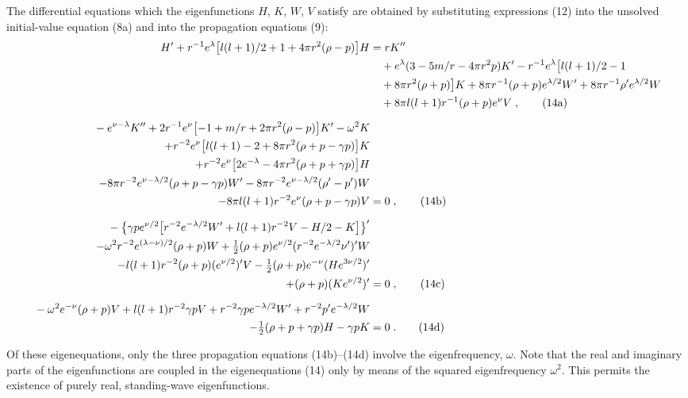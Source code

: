 \documentclass[12pt]{article}
\begin{document}
The differential equations which the eigenfunctions $H$, $K$, $W$, $V$ satisfy are obtained
by substituting expressions (12) into the unsolved initial-value equation (8a) and into
the propagation equations (9):
\begin{align}
  H' + r^{-1}e^{\lambda}\bigl[l(l+1)/2 + 1 + 4\pi r^{2}(\rho - p)\bigr]H
  &= r K'' \notag \\
  &\quad + e^{\lambda}(3 - 5m/r - 4\pi r^{2}p)K'
     - r^{-1}e^{\lambda}\bigl[l(l+1)/2 - 1 \notag \\
  &\quad + 8\pi r^{2}(\rho + p)\bigr]K
     + 8\pi r^{-1}(\rho + p)e^{\lambda/2}W'
     + 8\pi r^{-1}\rho' e^{\lambda/2}W \notag \\
  &\quad + 8\pi l(l+1)r^{-1}(\rho + p)e^{\nu}V \;,
\label{eq:14a} \tag{14a}
\\[6pt]
  {}-e^{\nu-\lambda}K''
  + 2r^{-1}e^{\nu}\bigl[-1 + m/r + 2\pi r^{2}(\rho - p)\bigr]K'
  - \omega^{2}K
  &\notag \\
  + r^{-2}e^{\nu}\bigl[l(l+1) - 2 + 8\pi r^{2}(\rho + p - \gamma p)\bigr]K
  &\notag \\
  + r^{-2}e^{\nu}\bigl[2e^{-\lambda} - 4\pi r^{2}(\rho + p + \gamma p)\bigr]H
  &\notag \\
  - 8\pi r^{-2}e^{\nu-\lambda/2}(\rho + p - \gamma p)W'
  - 8\pi r^{-2}e^{\nu-\lambda/2}(\rho' - p')W
  &\notag \\
  - 8\pi l(l+1)r^{-2}e^{\nu}(\rho + p - \gamma p)V
  &= 0 \;,
\label{eq:14b} \tag{14b}
\\[6pt]
  {}-\bigl\{\gamma p e^{\nu/2}\bigl[r^{-2}e^{-\lambda/2}W'
    + l(l+1)r^{-2}V - H/2 - K\bigr]\bigr\}'
  &\notag \\
  - \omega^{2}r^{-2}e^{(\lambda-\nu)/2}(\rho + p)W
  + \tfrac{1}{2}(\rho + p)e^{\nu/2}(r^{-2}e^{-\lambda/2}\nu')'W
  &\notag \\
  - l(l+1)r^{-2}(\rho + p)(e^{\nu/2})'V
  - \tfrac{1}{2}(\rho + p)e^{-\nu}(He^{3\nu/2})'
  &\notag \\
  + (\rho + p)(Ke^{\nu/2})'
  &= 0 \;,
\label{eq:14c} \tag{14c}
\\[6pt]
  {}-\omega^{2}e^{-\nu}(\rho + p)V
  + l(l+1)r^{-2}\gamma p V
  + r^{-2}\gamma p e^{-\lambda/2}W'
  + r^{-2}p' e^{-\lambda/2}W
  &\notag \\
  - \tfrac{1}{2}(\rho + p + \gamma p)H - \gamma p K
  &= 0 \;.
\label{eq:14d} \tag{14d}
\end{align}

Of these eigenequations, only the three propagation equations (14b)--(14d) involve the
eigenfrequency, $\omega$. Note that the real and imaginary parts of the eigenfunctions are
coupled in the eigenequations (14) only by means of the squared eigenfrequency $\omega^2$.
This permits the existence of purely real, standing-wave eigenfunctions.
\end{document}
